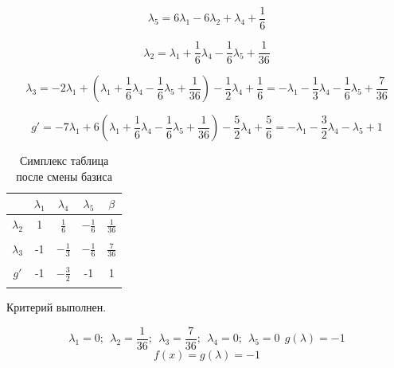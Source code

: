 \documentclass{article}
\begin{document}
\[\lambda_5 = 6\lambda_1-6\lambda_2+\lambda_4+\frac{1}{6}\]

\[\lambda_2 = \lambda_1 +\frac{1}{6}\lambda_4 -\frac{1}{6}\lambda_5+\frac{1}{36}\]

\[\lambda_3 = -2\lambda_1+(\lambda_1 +\frac{1}{6}\lambda_4 -\frac{1}{6}\lambda_5+\frac{1}{36})-\frac{1}{2}\lambda_4+\frac{1}{6}=
-\lambda_1 - \frac{1}{3}\lambda_4 - \frac{1}{6}\lambda_5 + \frac{7}{36}\]

\[g' = -7\lambda_1+6(\lambda_1 +\frac{1}{6}\lambda_4 -\frac{1}{6}\lambda_5+\frac{1}{36})-\frac{5}{2}\lambda_4+\frac{5}{6} = 
-\lambda_1 - \frac{3}{2}\lambda_4 - \lambda_5 +1\]

\begin{table}[H]
    \centering
    \caption{Симплекс таблица после смены базиса}
    \begin{tabular}{|c|c|c|c|c|}
    \hline
               &$\lambda_1$&$\lambda_4$&$\lambda_5$&$\beta$\\\hline
    $\lambda_2$&1&$\frac{1}{6}$&$-\frac{1}{6}$&$\frac{1}{36}$\\
    &&&&\\\hline
    $\lambda_3$&-1&$-\frac{1}{3}$&$-\frac{1}{6}$&$\frac{7}{36}$\\
    &&&&\\\hline
    $g'$&-1&$-\frac{3}{2}$&-1&1\\
    &&&&\\\hline
    \end{tabular}
\end{table}
Критерий выполнен.

\[\lambda_1 = 0;\ \ \lambda_2 = \frac{1}{36};\ \ \lambda_3 = \frac{7}{36};\ \ \lambda_4 = 0;\ \ \lambda_5 = 0 \ \ g(\lambda) = -1\]
\[f(x) = g(\lambda) = -1\]
\end{document}
